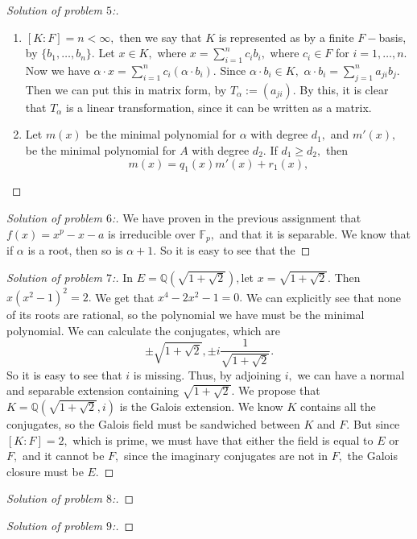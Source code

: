 \documentclass[letterpaper,11pt,twoside]{article}
\theoremstyle{proposition}
\theoremstyle{definition}
\theoremstyle{theorem}
\theoremstyle{definition}
\theoremstyle{definition}
\theoremstyle{definition}
\theoremstyle{lemma}
\theoremstyle{definition}
\theoremstyle{definition}
\theoremstyle{corollary}
\theoremstyle{definition}
\theoremstyle{definition}
\theoremstyle{definition}
\begin{document}
\begin{proof}[Solution of problem $5$:]
	\begin{enumerate}
		\item $[K:F]=n < \infty,$ then we say that $K$ is represented as by a finite $F-$basis, by $\{b_1,\dots, b_n\}.$ 
		Let $x \in K,$ where  $x= \sum_{i=1}^{n}c_ib_i,$ where $c_i \in F$ for $i=1,\dots,n.$
		Now we have $\alpha \cdot x= \sum_{i=1}^{n}c_i (\alpha \cdot b_i).$ Since $\alpha \cdot b_i \in K,$ $\alpha \cdot b_i= \sum_{j=1}^{n} a_{ji} b_j.$ 
		Then we can put this in matrix form, by $T_{\alpha}:= (a_{ji}).$ By this, it is clear that $T_{\alpha}$ is a linear transformation, since it can be 
		written as a matrix.
		
		\item Let $m(x)$ be the minimal polynomial for $\alpha$ with degree $d_1,$ and $m'(x),$ be the minimal polynomial for $A$ with degree $d_2.$ If $d_1 
		\geq d_2,$ then $$m(x) = q_1(x) m'(x) + r_1(x),$$
		
	\end{enumerate}
\end{proof}
\begin{proof}[Solution of problem $6$:]
	We have proven in the previous assignment that $f(x)=x^p-x-a$ is irreducible over $\mathbb{F}_p,$ and that it is separable.
	We know that if $\alpha$ is a root, then so is $\alpha + 1.$ So it is easy to see that the 
\end{proof}
\begin{proof}[Solution of problem $7$:]
	In $E=\mathbb{Q}(\sqrt{1+\sqrt{2}}),$let $x= \sqrt{1 + \sqrt{2}}.$ Then $x(x^2-1)^2=2.$ We get that $x^4-2x^2-1=0.$ We can explicitly see that none of 
	its roots are rational, so the polynomial we have must be the minimal polynomial. We can calculate the conjugates, which are $$\pm \sqrt{1+ \sqrt{2}}, 
	\pm i \frac{1}{\sqrt{1+ \sqrt{2}}}.$$ So it is easy to see that $i$ is missing. Thus, by adjoining $i,$ we can have a normal and separable extension 
	containing $\sqrt{1+ \sqrt{2}}.$ We propose that $K=\mathbb{Q}(\sqrt{1+ \sqrt{2}},i)$ is the Galois extension. We know $K$ contains all the conjugates, 
	so the Galois field must be sandwiched between $K$ and $F.$ But since $[K:F]=2,$ which is prime, we must have that either the field is equal to $E$ or 
	$F,$ and it cannot be $F,$ since the imaginary conjugates are not in $F,$ the Galois closure must be $E.$
\end{proof}
\begin{proof}[Solution of problem $8$:]
	
\end{proof}
\begin{proof}[Solution of problem $9$:]
	
\end{proof}
\end{document}
